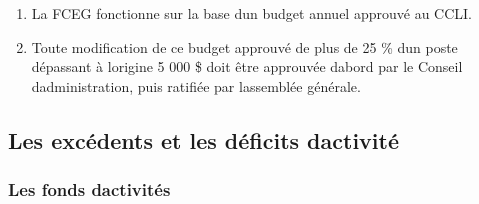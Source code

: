 \begin{enumerate}
 \item
  La FCEG fonctionne sur la base d\textquotesingle un budget annuel approuvé au CCLI.
 \item
  Toute modification de ce budget approuvé de plus de 25 \% d\textquotesingle un poste dépassant à l\textquotesingle origine 5 000 \$ doit être approuvée d\textquotesingle abord par le Conseil d\textquotesingle administration, puis ratifiée par l\textquotesingle assemblée générale.
\end{enumerate}

\subsection{Les excédents et les déficits d\textquotesingle activité}
\label{les-excedents-et-les-deficits-d-activite}

\subsubsection{Les fonds d\textquotesingle activités}
\label{les-fonds-d-activites}


